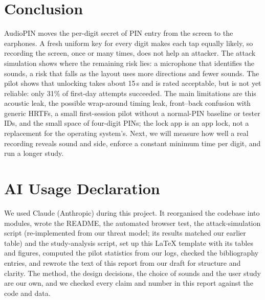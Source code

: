 \documentclass[conference]{IEEEtran}
\begin{document}
\section{Conclusion}
AudioPIN moves the per-digit secret of PIN entry from the screen to the earphones. A fresh uniform key
for every digit makes each tap equally likely, so recording the screen, once or many times, does not
help an attacker. The attack simulation shows where the remaining risk lies: a microphone that
identifies the sounds, a risk that falls as the layout uses more directions and fewer sounds. The pilot shows that unlocking takes about 15\,s and is rated
acceptable, but is not yet reliable: only 31\% of first-day attempts succeeded. The main limitations are this acoustic leak, the possible wrap-around
timing leak, front--back confusion with generic HRTFs, a small first-session pilot without a normal-PIN baseline or tester IDs, and the small
space of four-digit PINs; the lock app is an app lock, not a replacement for the operating system's.
Next, we will measure how well a real recording reveals sound and side, enforce a constant minimum time
per digit, and run a longer study.

\section*{AI Usage Declaration}
We used Claude (Anthropic) during this project. It reorganised the codebase into modules, wrote the
README, the automated browser test, the attack-simulation script (re-implemented from our threat model;
its results matched our earlier table) and the study-analysis script, set up this LaTeX template with
its tables and figures, computed the pilot statistics from our logs, checked the bibliography entries,
and rewrote the text of this report from our draft for structure and clarity. The method, the design
decisions, the choice of sounds and the user study are our own, and we checked every claim and number
in this report against the code and data.



\end{document}

